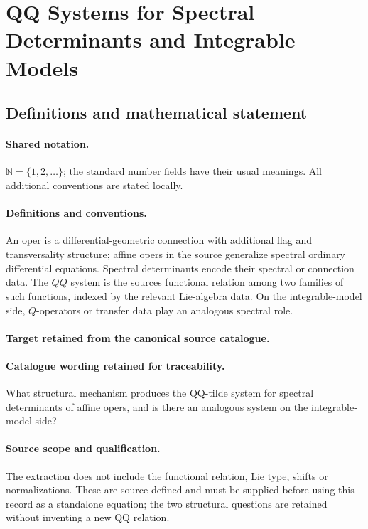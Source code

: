 \documentclass[11pt]{article}
\begin{document}
\section{QQ Systems for Spectral Determinants and Integrable Models}\label{statement}

\subsection{Definitions and mathematical statement}

\paragraph{Shared notation.}$\mathbb N=\{1,2,\ldots\}$; the standard number fields have their usual meanings. All additional conventions are stated locally.


\paragraph{Definitions and conventions.}
An oper is a differential-geometric connection with additional flag and transversality structure; affine opers in the source generalize spectral ordinary differential equations. Spectral determinants encode their spectral or connection data. The $Q\widetilde Q$ system is the source\textquotesingle s functional relation among two families of such functions, indexed by the relevant Lie-algebra data. On the integrable-model side, $Q$-operators or transfer data play an analogous spectral role.

\paragraph{Target retained from the canonical source catalogue.}
\paragraph{Catalogue wording retained for traceability.}
What structural mechanism produces the QQ-tilde system for spectral determinants of affine opers, and is there an analogous system on the integrable-model side?

\paragraph{Source scope and qualification.}
The extraction does not include the functional relation, Lie type, shifts or normalizations. These are source-defined and must be supplied before using this record as a standalone equation; the two structural questions are retained without inventing a new QQ relation.
\end{document}

